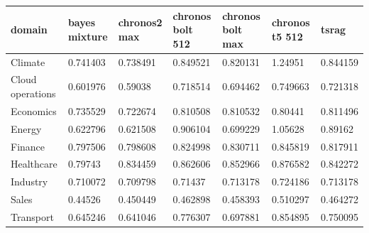 \begin{tabular}{lllllll}
\toprule
domain & bayes mixture & chronos2 max & chronos bolt 512 & chronos bolt max & chronos t5 512 & tsrag \\
\midrule
Climate & 0.741403 & 0.738491 & 0.849521 & 0.820131 & 1.24951 & 0.844159 \\
Cloud operations & 0.601976 & 0.59038 & 0.718514 & 0.694462 & 0.749663 & 0.721318 \\
Economics & 0.735529 & 0.722674 & 0.810508 & 0.810532 & 0.80441 & 0.811496 \\
Energy & 0.622796 & 0.621508 & 0.906104 & 0.699229 & 1.05628 & 0.89162 \\
Finance & 0.797506 & 0.798608 & 0.824998 & 0.830711 & 0.845819 & 0.817911 \\
Healthcare & 0.79743 & 0.834459 & 0.862606 & 0.852966 & 0.876582 & 0.842272 \\
Industry & 0.710072 & 0.709798 & 0.71437 & 0.713178 & 0.724186 & 0.713178 \\
Sales & 0.44526 & 0.450449 & 0.462898 & 0.458393 & 0.510297 & 0.464272 \\
Transport & 0.645246 & 0.641046 & 0.776307 & 0.697881 & 0.854895 & 0.750095 \\
\bottomrule
\end{tabular}
